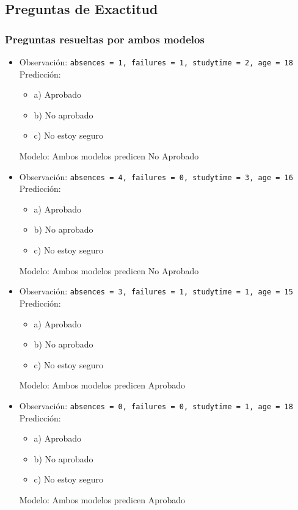 \subsection*{Preguntas de Exactitud}

\subsubsection*{Preguntas resueltas por ambos modelos}
\begin{itemize}
    \item Observación: \texttt{absences = 1, failures = 1, studytime = 2, age = 18}\\
    Predicción:
    \begin{itemize}
        \item a) Aprobado
        \item b) No aprobado
        \item c) No estoy seguro
    \end{itemize}
    Modelo: Ambos modelos predicen No Aprobado

    \item Observación: \texttt{absences = 4, failures = 0, studytime = 3, age = 16}\\
    Predicción:
    \begin{itemize}
        \item a) Aprobado
        \item b) No aprobado
        \item c) No estoy seguro
    \end{itemize}
    Modelo: Ambos modelos predicen No Aprobado

    \item Observación: \texttt{absences = 3, failures = 1, studytime = 1, age = 15}\\
    Predicción:
    \begin{itemize}
        \item a) Aprobado
        \item b) No aprobado
        \item c) No estoy seguro
    \end{itemize}
    Modelo: Ambos modelos predicen Aprobado

    \item Observación: \texttt{absences = 0, failures = 0, studytime = 1, age = 18}\\
    Predicción:
    \begin{itemize}
        \item a) Aprobado
        \item b) No aprobado
        \item c) No estoy seguro
    \end{itemize}
    Modelo: Ambos modelos predicen Aprobado


\end{itemize}
